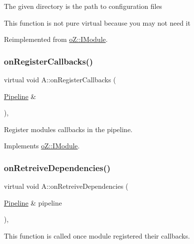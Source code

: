 The given directory is the path to configuration files

This function is not pure virtual because you may not need it 

Reimplemented from \mbox{\hyperlink{classo_z_1_1_i_module_a61a2cc76594401ed2f50931a6a6b76f3}{o\+Z\+::\+I\+Module}}.

\mbox{\label{class_a_ac82f8db798576ee2eff8b6b91b77c239}} 
\subsubsection{\texorpdfstring{onRegisterCallbacks()}{onRegisterCallbacks()}}
{\footnotesize\ttfamily virtual void A\+::on\+Register\+Callbacks (\begin{DoxyParamCaption}\item[{\mbox{\hyperlink{classo_z_1_1_pipeline}{Pipeline}} \&}]{ }\end{DoxyParamCaption})\hspace{0.3cm}{\ttfamily [inline]}, {\ttfamily [virtual]}}



Register module\textquotesingle{}s callbacks in the pipeline. 



Implements \mbox{\hyperlink{classo_z_1_1_i_module_a3dc905faa6df5e22eecc6ffbc923fd95}{o\+Z\+::\+I\+Module}}.

\mbox{\label{class_a_a968473c1dcccfee5502df74229fb263b}} 
\subsubsection{\texorpdfstring{onRetreiveDependencies()}{onRetrieveDependencies()}}
{\footnotesize\ttfamily virtual void A\+::on\+Retreive\+Dependencies (\begin{DoxyParamCaption}\item[{\mbox{\hyperlink{classo_z_1_1_pipeline}{Pipeline}} \&}]{pipeline }\end{DoxyParamCaption})\hspace{0.3cm}{\ttfamily [inline]}, {\ttfamily [virtual]}}



This function is called once module registered their callbacks. 

